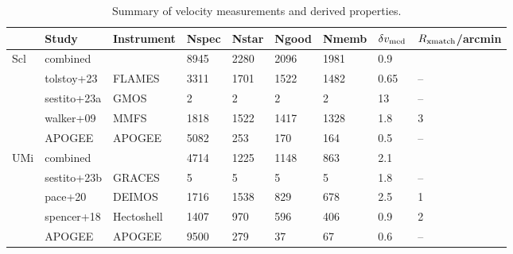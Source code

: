 \begin{table*}[t]
\centering
\caption{Summary of velocity measurements and derived properties.}
\begin{tabular}{lllllllll}
\toprule
 & Study & Instrument & Nspec & Nstar & Ngood & Nmemb & $\delta v_{\rm med}$ & $R_{\rm xmatch}$/arcmin\\
\midrule
Scl & combined &  & 8945 & 2280 & 2096 & 1981 & 0.9 & \\
 & tolstoy+23 & FLAMES & 3311 & 1701 & 1522 & 1482 & 0.65 & –\\
 & sestito+23a & GMOS & 2 & 2 & 2 & 2 & 13 & –\\
 & walker+09 & MMFS & 1818 & 1522 & 1417 & 1328 & 1.8 & 3\\
 & APOGEE & APOGEE & 5082 & 253 & 170 & 164 & 0.5 & –\\
UMi & combined &  & 4714 & 1225 & 1148 & 863 & 2.1 & \\
 & sestito+23b & GRACES & 5 & 5 & 5 & 5 & 1.8 & –\\
 & pace+20 & DEIMOS & 1716 & 1538 & 829 & 678 & 2.5 & 1\\
 & spencer+18 & Hectoshell & 1407 & 970 & 596 & 406 & 0.9 & 2\\
 & APOGEE & APOGEE & 9500 & 279 & 37 & 67 & 0.6 & –\\
\bottomrule
\end{tabular}
\end{table*}


